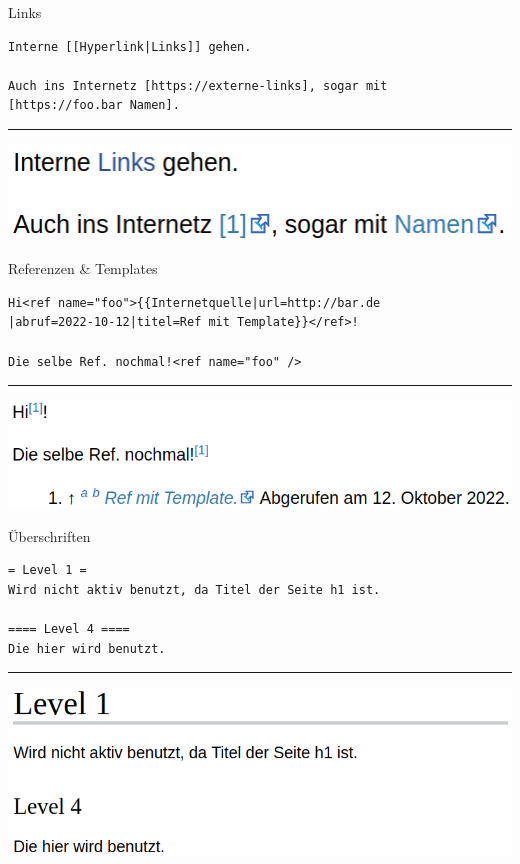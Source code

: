 \documentclass[9pt]{beamer}
\begin{document}
	\begin{frame}[fragile]{Links}
		\begin{verbatim}
Interne [[Hyperlink|Links]] gehen.

Auch ins Internetz [https://externe-links], sogar mit
[https://foo.bar Namen].
		\end{verbatim}
		\hrule\n
		\includegraphics[scale=0.35]{images/wikitext-example-1-links.png}
	\end{frame}
	
	\begin{frame}[fragile]{Referenzen \& Templates}
		\begin{verbatim}
Hi<ref name="foo">{{Internetquelle|url=http://bar.de
|abruf=2022-10-12|titel=Ref mit Template}}</ref>!

Die selbe Ref. nochmal!<ref name="foo" />
		\end{verbatim}
		\hrule\n
		\includegraphics[scale=0.35]{images/wikitext-example-2-refs.png}
	\end{frame}
	
	\begin{frame}[fragile]{Überschriften}
		\begin{verbatim}
= Level 1 =
Wird nicht aktiv benutzt, da Titel der Seite h1 ist.

==== Level 4 ====
Die hier wird benutzt.
		\end{verbatim}
		\hrule\n
		\includegraphics[scale=0.35]{images/wikitext-example-3-headings.png}
	\end{frame}
\end{document}
